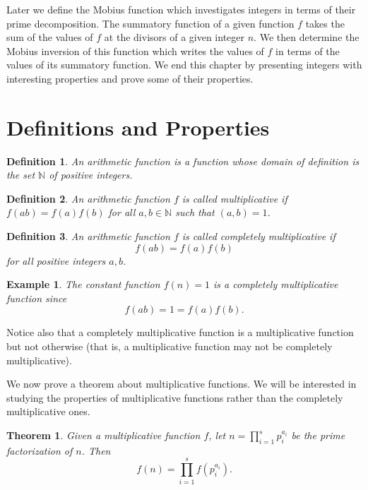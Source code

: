 \documentclass[12pt,letterpaper]{book}
\newtheorem{definition}{Definition}
\newtheorem{theorem}{Theorem}
\newtheorem{example}{Example}
\begin{document}
\par Later we define the Mobius function which investigates
integers in terms of their prime decomposition. The summatory
function of a given function $f$ takes the sum of the values of $f$ at
the divisors of a given integer $n$. We then determine the Mobius
inversion of this function which writes the values of $f$ in terms
of the values of its summatory function.  We end this chapter by
presenting integers with interesting properties and prove some of
their properties. 

\newpage

\section{Definitions and Properties} 
\begin{definition}
An arithmetic function is a function whose domain of definition is the set $\mathbb{N}$ of positive integers.
\end{definition}
\begin{definition}
An arithmetic function $f$ is called multiplicative if
$f(ab)=f(a)f(b)$ for all $a,b\in\mathbb{N}$ such that $(a,b)=1$.
\end{definition}

\begin{definition}
An arithmetic function $f$ is called completely multiplicative if
\begin{equation}
f(ab)=f(a)f(b)
\end{equation}
for all positive integers $a,b$.
\end{definition}
\begin{example}
The constant function $f(n)=1$ is a completely multiplicative
function since
\begin{equation*}
f(ab)=1=f(a)f(b).
\end{equation*}
\end{example}
Notice also that a completely multiplicative function is a
multiplicative function but not otherwise (that is, a multiplicative function may not be completely multiplicative).

\par We now prove a theorem about multiplicative functions.  We will be
interested in studying the properties of multiplicative functions
rather than the completely multiplicative ones.

\begin{theorem}
Given a multiplicative function $f$, let $n=\prod_{i=1}^sp_i^{a_i}$
be the prime factorization of $n$. Then
\begin{equation*}
f(n)=\prod_{i=1}^sf(p_i^{a_i}).
\end{equation*}
\end{theorem}
\end{document}
